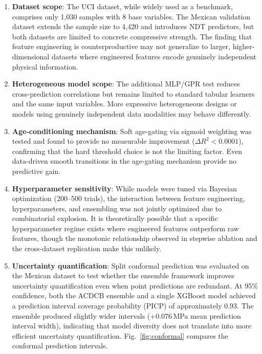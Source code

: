 \documentclass[journal]{IEEEtran}
\begin{document}
\begin{enumerate}
\item \textbf{Dataset scope}: The UCI dataset, while widely used as a benchmark, comprises only 1{,}030 samples with 8 base variables. The Mexican validation dataset extends the sample size to 4{,}420 and introduces NDT predictors, but both datasets are limited to concrete compressive strength. The finding that feature engineering is counterproductive may not generalize to larger, higher-dimensional datasets where engineered features encode genuinely independent physical information.

\item \textbf{Heterogeneous model scope}: The additional MLP/GPR test reduces cross-prediction correlations but remains limited to standard tabular learners and the same input variables. More expressive heterogeneous designs or models using genuinely independent data modalities may behave differently.

\item \textbf{Age-conditioning mechanism}: Soft age-gating via sigmoid weighting was tested and found to provide no measurable improvement ($\Delta R^2 < 0.0001$), confirming that the hard threshold choice is not the limiting factor. Even data-driven smooth transitions in the age-gating mechanism provide no predictive gain.

\item \textbf{Hyperparameter sensitivity}: While models were tuned via Bayesian optimization (200--500 trials), the interaction between feature engineering, hyperparameters, and ensembling was not jointly optimized due to combinatorial explosion. It is theoretically possible that a specific hyperparameter regime exists where engineered features outperform raw features, though the monotonic relationship observed in stepwise ablation and the cross-dataset replication make this unlikely.

\item \textbf{Uncertainty quantification}: Split conformal prediction \cite{angelopoulos2021conformal} was evaluated on the Mexican dataset to test whether the ensemble framework improves uncertainty quantification even when point predictions are redundant. At 95\% confidence, both the ACDCB ensemble and a single XGBoost model achieved a prediction interval coverage probability (PICP) of approximately 0.93. The ensemble produced slightly wider intervals ($+0.076$\,MPa mean prediction interval width), indicating that model diversity does not translate into more efficient uncertainty quantification. Fig.~\ref{fig:conformal} compares the conformal prediction intervals.


\end{enumerate}
\end{document}

